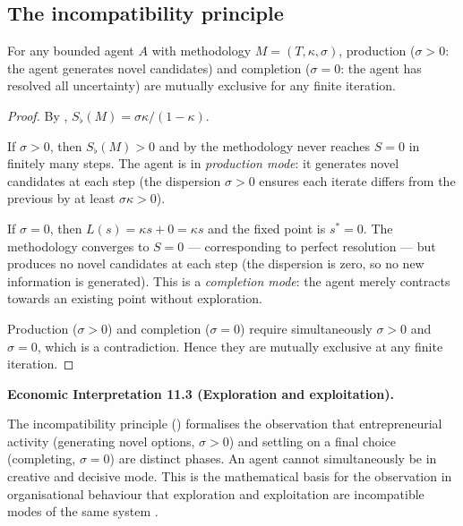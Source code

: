 \documentclass[twocolumn,11pt,a4paper]{article}
\newenvironment{econinterp}[1]{%
  \medskip\noindent\textbf{Economic Interpretation #1.}\normalfont\itshape\space
}{%
  \medskip
}
\newcommand{\Sfloor}{S_{\flat}}
\begin{document}
\subsection{The incompatibility principle}
\label{sec:incompatibility}

\begin{theorem}[Incompatibility]
\label{thm:incompatibility}
For any bounded agent $A$ with methodology $M=(T,\kappa,\sigma)$,
production ($\sigma>0$: the agent generates novel candidates) and
completion ($\sigma=0$: the agent has resolved all uncertainty) are
mutually exclusive for any finite iteration.
\end{theorem}

\begin{proof}
By , $\Sfloor(M)=\sigma\kappa/(1-\kappa)$.

If $\sigma>0$, then $\Sfloor(M)>0$ and by  the
methodology never reaches $S=0$ in finitely many steps.  The agent is in
\emph{production mode}: it generates novel candidates at each step (the
dispersion $\sigma>0$ ensures each iterate differs from the previous by
at least $\sigma\kappa>0$).

If $\sigma=0$, then $L(s)=\kappa s+0=\kappa s$ and the fixed point is
$s^*=0$.  The methodology converges to $S=0$ — corresponding to perfect
resolution — but produces no novel candidates at each step (the dispersion
is zero, so no new information is generated).  This is a \emph{completion
mode}: the agent merely contracts towards an existing point without
exploration.

Production ($\sigma>0$) and completion ($\sigma=0$) require simultaneously
$\sigma>0$ and $\sigma=0$, which is a contradiction.  Hence they are
mutually exclusive at any finite iteration.
\end{proof}

\begin{econinterp}{11.3 (Exploration and exploitation)}
The incompatibility principle () formalises the
observation that entrepreneurial activity (generating novel options,
$\sigma>0$) and settling on a final choice (completing, $\sigma=0$) are
distinct phases.  An agent cannot simultaneously be in creative and
decisive mode.  This is the mathematical basis for the observation in
organisational behaviour that exploration and exploitation are
incompatible modes of the same system \cite{march1991}.
\end{econinterp}

\end{document}
